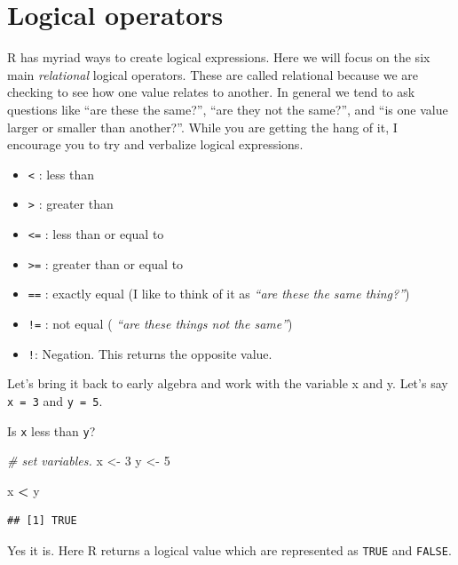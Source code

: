 \documentclass[
]{book}
\newenvironment{Shaded}{\begin{snugshade}}{\end{snugshade}}
\newcommand{\CommentTok}[1]{\textcolor[rgb]{0.56,0.35,0.01}{\textit{#1}}}
\newcommand{\DecValTok}[1]{\textcolor[rgb]{0.00,0.00,0.81}{#1}}
\newcommand{\NormalTok}[1]{#1}
\newcommand{\OperatorTok}[1]{\textcolor[rgb]{0.81,0.36,0.00}{\textbf{#1}}}
\newcommand{\StringTok}[1]{\textcolor[rgb]{0.31,0.60,0.02}{#1}}
\providecommand{\tightlist}{%
  \setlength{\itemsep}{0pt}\setlength{\parskip}{0pt}}
\begin{document}
\hypertarget{logical-operators}{%
\section{Logical operators}\label{logical-operators}}

R has myriad ways to create logical expressions. Here we will focus on the six main \emph{relational} logical operators. These are called relational because we are checking to see how one value relates to another. In general we tend to ask questions like ``are these the same?'', ``are they not the same?'', and ``is one value larger or smaller than another?''. While you are getting the hang of it, I encourage you to try and verbalize logical expressions.

\begin{itemize}
\tightlist
\item
  \texttt{\textless{}} : less than
\item
  \texttt{\textgreater{}} : greater than
\item
  \texttt{\textless{}=} : less than or equal to
\item
  \texttt{\textgreater{}=} : greater than or equal to
\item
  \texttt{==} : exactly equal (I like to think of it as \emph{``are these the same thing?''})
\item
  \texttt{!=} : not equal ( \emph{``are these things not the same''})
\item
  \texttt{!}: Negation. This returns the opposite value.
\end{itemize}

Let's bring it back to early algebra and work with the variable x and y. Let's say \texttt{x\ =\ 3} and \texttt{y\ =\ 5}.

Is \texttt{x} less than \texttt{y}?

\begin{Shaded}
\begin{Highlighting}[]
\CommentTok{\# set variables.}
\NormalTok{x \textless{}{-}}\StringTok{ }\DecValTok{3}
\NormalTok{y \textless{}{-}}\StringTok{ }\DecValTok{5}

\NormalTok{x }\OperatorTok{\textless{}}\StringTok{ }\NormalTok{y}
\end{Highlighting}
\end{Shaded}

\begin{verbatim}
## [1] TRUE
\end{verbatim}

Yes it is. Here R returns a logical value which are represented as \texttt{TRUE} and \texttt{FALSE}.
\end{document}
